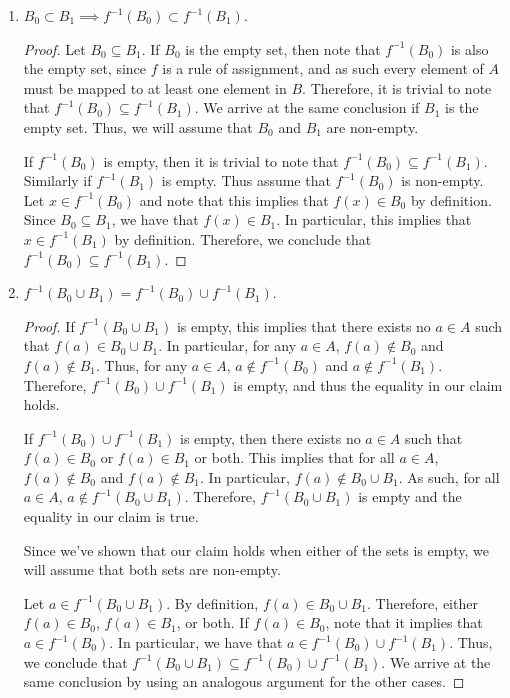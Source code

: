 \documentclass[12pt]{article}
\begin{document}
\begin{enumerate}[label=(\alph*)]
	\item $B_0 \subset B_1 \implies f^{-1}(B_0) \subset f^{-1}(B_1)$.
	\begin{proof}
		Let $B_0 \subseteq B_1$. If $B_0$ is the empty set, then note that $f^{-1}(B_0)$
		is also the empty set, since $f$ is a rule of assignment, and as such every element
		of $A$ must be mapped to at least one element in $B$. Therefore, it is trivial to note
		that $f^{-1}(B_0) \subseteq f^{-1}(B_1)$. We arrive at the same conclusion if 
		$B_1$ is the empty set. Thus, we will assume that $B_0$ and $B_1$ are non-empty.
		
		If $f^{-1}(B_0)$ is empty, then it is trivial to note that $f^{-1}(B_0) \subseteq 
		f^{-1}(B_1)$. Similarly if $f^{-1}(B_1)$ is empty. Thus assume that 
		$f^{-1}(B_0)$ is non-empty. Let $x \in f^{-1}(B_0)$ and note that this implies 
		that $f(x) \in B_0$ by definition. Since $B_0 \subseteq B_1$, we have that 
		$f(x) \in B_1$. In particular, this implies that $x \in f^{-1}(B_1)$ by definition.
		Therefore, we conclude that $f^{-1}(B_0) \subseteq f^{-1}(B_1)$.
	\end{proof}
	\item $f^{-1}(B_0 \cup B_1) = f^{-1}(B_0) \cup f^{-1}(B_1)$.
	\begin{proof}
		If $f^{-1}(B_0 \cup B_1)$ is empty, this implies that there exists no 
		$a \in A$ such that $f(a) \in B_0 \cup B_1$. In particular, for any $a \in A$,
		$f(a) \notin B_0$ and $f(a) \notin B_1$. Thus, for any $a \in A$, 
		$a \notin f^{-1}(B_0)$ and $a \notin f^{-1}(B_1)$. Therefore, $f^{-1}(B_0)
		\cup f^{-1}(B_1)$ is empty, and thus the equality in our claim holds.
		
		If $f^{-1}(B_0) \cup f^{-1}(B_1)$ is empty, then there exists no $a \in A$
		such that $f(a) \in B_0$ or $f(a) \in B_1$ or both. This implies that for
		all $a \in A$, $f(a) \notin B_0$ and $f(a) \notin B_1$. In particular,
		$f(a) \notin B_0 \cup B_1$. As such, for all $a \in A$, $a \notin f^{-1}(B_0 \cup B_1)$.
		Therefore, $f^{-1}(B_0 \cup B_1)$ is empty and the equality in our claim is 
		true.
		
		Since we've shown that our claim holds when either of the sets is empty, we will
		assume that both sets are non-empty.
		
		Let $a \in f^{-1}(B_0 \cup B_1)$. By definition, $f(a) \in B_0 \cup B_1$.
		Therefore, either $f(a) \in B_0$, $f(a) \in B_1$, or both. If $f(a) \in B_0$,
		note that it implies that $a \in f^{-1}(B_0)$. In particular, we have that 
		$a \in f^{-1}(B_0) \cup f^{-1}(B_1)$. Thus, we conclude that 
		$f^{-1}(B_0 \cup B_1) \subseteq f^{-1}(B_0) \cup f^{-1}(B_1)$. We arrive at 
		the same conclusion by using an analogous argument for the other cases.
		

\end{proof}
\end{enumerate}
\end{document}
